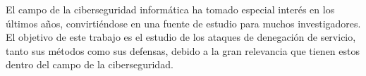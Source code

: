 El campo de la ciberseguridad informática ha tomado especial interés en los últimos a\~nos, convirtiéndose en una fuente de estudio para muchos investigadores. El objetivo de este trabajo es el estudio de los ataques de denegación de servicio, tanto sus métodos como sus defensas, debido a la gran relevancia que tienen estos dentro del campo de la ciberseguridad. 

